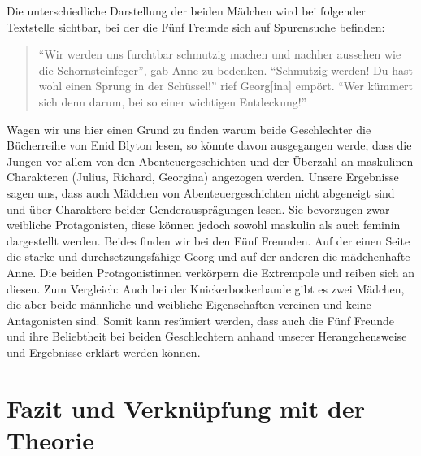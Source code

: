 Die unterschiedliche Darstellung der beiden Mädchen wird bei folgender
Textstelle sichtbar, bei der die Fünf Freunde sich auf Spurensuche
befinden:

\begin{quote}
``Wir werden uns furchtbar schmutzig machen und nachher aussehen wie die
Schornsteinfeger'', gab Anne zu bedenken. ``Schmutzig werden! Du hast
wohl einen Sprung in der Schüssel!'' rief Georg{[}ina{]} empört. ``Wer
kümmert sich denn darum, bei so einer wichtigen
Entdeckung!''\parencite[][138]{Blyton2009}
\end{quote}

Wagen wir uns hier einen Grund zu finden warum beide Geschlechter die
Bücherreihe von Enid Blyton lesen, so könnte davon ausgegangen werde,
dass die Jungen vor allem von den Abenteuergeschichten und der Überzahl
an maskulinen Charakteren (Julius, Richard, Georgina) angezogen werden.
Unsere Ergebnisse sagen uns, dass auch Mädchen von Abenteuergeschichten
nicht abgeneigt sind und über Charaktere beider Genderausprägungen
lesen. Sie bevorzugen zwar weibliche Protagonisten, diese können jedoch
sowohl maskulin als auch feminin dargestellt werden. Beides finden wir
bei den Fünf Freunden. Auf der einen Seite die starke und
durchsetzungsfähige Georg und auf der anderen die mädchenhafte Anne. Die
beiden Protagonistinnen verkörpern die Extrempole und reiben sich an
diesen. Zum Vergleich: Auch bei der Knickerbockerbande gibt es zwei
Mädchen, die aber beide männliche und weibliche Eigenschaften vereinen
und keine Antagonisten sind. Somit kann resümiert werden, dass auch die
Fünf Freunde und ihre Beliebtheit bei beiden Geschlechtern anhand
unserer Herangehensweise und Ergebnisse erklärt werden können.

\section{Fazit und Verknüpfung mit der Theorie}

